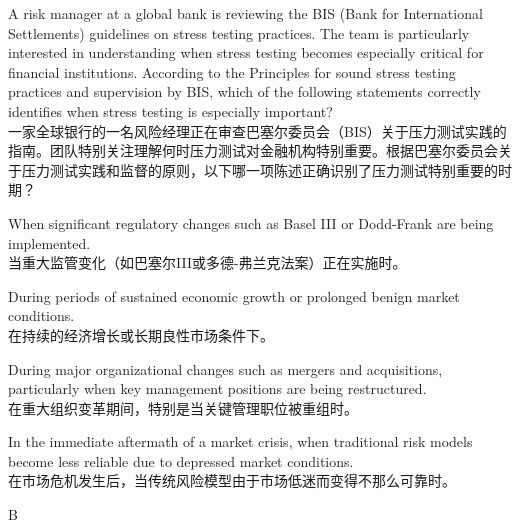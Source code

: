 \documentclass{article}
\newcounter{question} %
\begin{document}
\begin{question}
    A risk manager at a global bank is reviewing the BIS (Bank for International Settlements) guidelines on stress testing practices. The team is particularly interested in understanding when stress testing becomes especially critical for financial institutions. According to the Principles for sound stress testing practices and supervision by BIS, which of the following statements correctly identifies when stress testing is especially important?\\
    一家全球银行的一名风险经理正在审查巴塞尔委员会（BIS）关于压力测试实践的指南。团队特别关注理解何时压力测试对金融机构特别重要。根据巴塞尔委员会关于压力测试实践和监督的原则，以下哪一项陈述正确识别了压力测试特别重要的时期？
    \end{question}
    
    \begin{choices}
    \item When significant regulatory changes such as Basel III or Dodd-Frank are being implemented.\\
    当重大监管变化（如巴塞尔III或多德-弗兰克法案）正在实施时。
    \item During periods of sustained economic growth or prolonged benign market conditions.\\
    在持续的经济增长或长期良性市场条件下。
    \item During major organizational changes such as mergers and acquisitions, particularly when key management positions are being restructured.\\
    在重大组织变革期间，特别是当关键管理职位被重组时。
    \item In the immediate aftermath of a market crisis, when traditional risk models become less reliable due to depressed market conditions.\\
    在市场危机发生后，当传统风险模型由于市场低迷而变得不那么可靠时。
    \end{choices}
    
    \begin{correctanswer}
    B
    \end{correctanswer}
    
\end{document}
